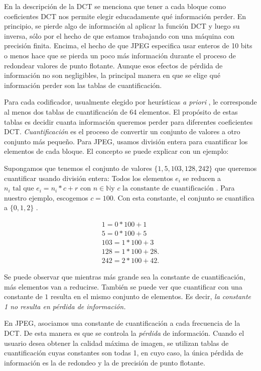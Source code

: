 En la descripción de la DCT se menciona que tener a cada bloque como
coeficientes DCT nos permite elegir educadamente qué información perder. En
principio, se pierde algo de información al aplicar la función DCT y luego su
inversa, sólo por el hecho de que estamos trabajando con una máquina con
precisión finita. Encima, el hecho de que JPEG especifica usar enteros de 10
bits o menos hace que se pierda un poco más información durante el proceso de
redondear valores de punto flotante. Aunque esos efectos de pérdida de
información no son negligibles, la principal manera en que se elige qué
información perder son las tablas de cuantificación.

Para cada codificador, usualmente elegido por heurísticas \emph{ a priori }, le
corresponde al menos dos tablas de cuantificación de 64 elementos. El propósito
de estas tablas es decidir cuanta información queremos perder para diferentes
coeficientes DCT. \emph{Cuantificación} es el proceso de convertir un conjunto
de valores a otro conjunto más pequeño. Para JPEG, usamos división entera para
cuantificar los elementos de cada bloque. El concepto se puede explicar con un
ejemplo:

Supongamos que tenemos el conjunto de valores $ \{ 1, 5, 103, 128, 242 \} $ que
queremos cuantificar usando división entera: Todos los elementos $e_i$ se
reducen a $ n_i \text{ tal que } e_i = n_i * c + r \text{ con } n \in ℕ \text{
y } c \text{ la constante de cuantificación }$. Para nuestro ejemplo, escogemos
$ c = 100 $. Con esta constante, el conjunto se cuantifica a $ \{ 0, 1, 2 \}$ .

\begin{eqnarray*}
    1 = 0 * 100 + 1 \\
    5 = 0 * 100 + 5 \\
    103 = 1 * 100 + 3 \\
    128 = 1 * 100 + 28. \\
    242 = 2 * 100 + 42.
\end{eqnarray*}

Se puede observar que mientras más grande sea la constante de cuantificación,
más elementos van a reducirse. También se puede ver que cuantificar con una
constante de $1$ resulta en el mismo conjunto de elementos. Es decir, \emph{ la constante 1 no resulta en pérdida de información.}

En JPEG, asociamos una constante de cuantificación a cada frecuencia de la DCT.
De esta manera es que se controla la \emph{pérdida} de información. Cuando el
usuario desea obtener la calidad máxima de imagen, se utilizan tablas de
cuantificación cuyas constantes son todas 1, en cuyo caso, la única pérdida de información es la de redondeo y la de precisión de punto flotante.

